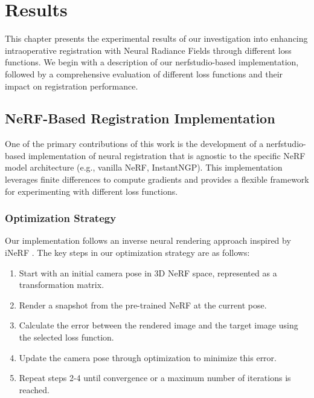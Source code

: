 
\chapter{Results}\label{chapter:results}

This chapter presents the experimental results of our investigation into enhancing intraoperative registration with Neural Radiance Fields through different loss functions. We begin with a description of our nerfstudio-based implementation, followed by a comprehensive evaluation of different loss functions and their impact on registration performance.

\section{NeRF-Based Registration Implementation}

One of the primary contributions of this work is the development of a nerfstudio-based implementation of neural registration that is agnostic to the specific NeRF model architecture (e.g., vanilla NeRF, InstantNGP). This implementation leverages finite differences to compute gradients and provides a flexible framework for experimenting with different loss functions.

\subsection{Optimization Strategy}

Our implementation follows an inverse neural rendering approach inspired by iNeRF \parencite{yen2020inerf}. The key steps in our optimization strategy are as follows:

\begin{enumerate}
    \item Start with an initial camera pose in 3D NeRF space, represented as a transformation matrix.
    
    \item Render a snapshot from the pre-trained NeRF at the current pose.
    
    \item Calculate the error between the rendered image and the target image using the selected loss function.
    
    \item Update the camera pose through optimization to minimize this error.
    
    \item Repeat steps 2-4 until convergence or a maximum number of iterations is reached.
\end{enumerate}

